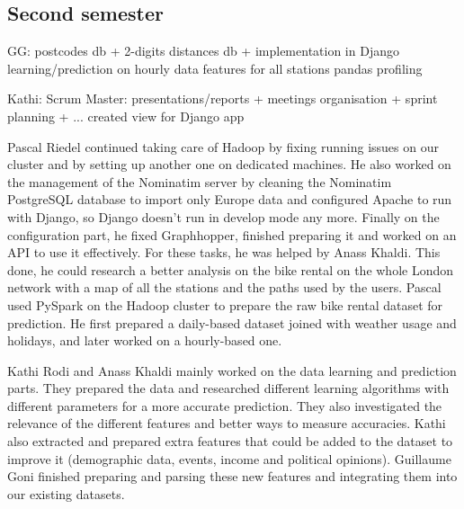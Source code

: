 \subsection{Second semester}

GG:
postcodes db + 2-digits distances db + implementation in Django
learning/prediction on hourly data
features for all stations
pandas profiling

Kathi:
Scrum Master: presentations/reports + meetings organisation + sprint planning + ...
created view for Django app

Pascal Riedel continued taking care of Hadoop by fixing running issues on our
cluster and by setting up another one on dedicated machines.
He also worked on the management of the Nominatim server by cleaning the Nominatim
PostgreSQL database to import only Europe data and configured Apache to run with
Django, so Django doesn't run in develop mode any more.
Finally on the configuration part, he fixed Graphhopper, finished preparing it
and worked on an API to use it effectively. For these tasks, he was helped by
Anass Khaldi.  
This done, he could research a better analysis on the bike rental on the whole
London network with a map of all the stations and the paths used by the users.
Pascal used PySpark on the Hadoop cluster to prepare the raw bike rental dataset
for prediction. He first prepared a daily-based dataset joined with weather usage
and holidays, and later worked on a hourly-based one.

Kathi Rodi and Anass Khaldi mainly worked on the data learning and prediction
parts. They prepared the data and researched different learning algorithms with
different parameters for a more accurate prediction. They also investigated the
relevance of the different features and better ways to measure accuracies.
Kathi also extracted and prepared extra features that could be added to the
dataset to improve it (demographic data, events, income and political opinions).
Guillaume Goni finished preparing and parsing these new features and integrating
them into our existing datasets.
